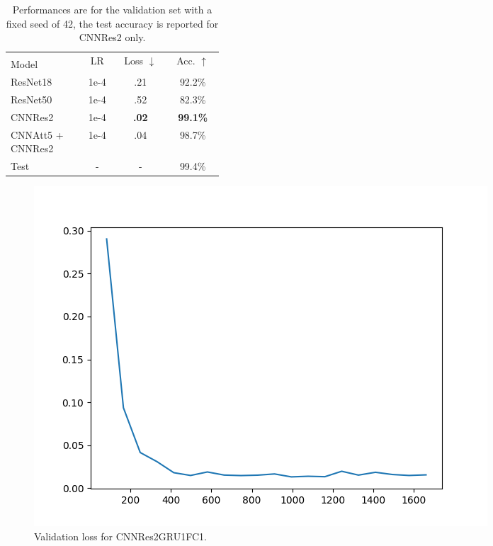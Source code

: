 \documentclass{article}
\begin{document}
\begin{table}[h!]
    \caption{Performances are for the validation set with a fixed seed of 42, the test accuracy is reported for CNNRes2 only.}
    \label{tab:joint-results}
    \begin{center}
        \begin{small}
            \begin{tabular}{p{0.35\linewidth} | ccc}
                \toprule
                & \multirow{2}{0.13\linewidth}{LR} 
                & \multirow{2}{0.13\linewidth}{Loss $\downarrow$} 
                & \multirow{2}{0.13\linewidth}{Acc. $\uparrow$} \\
                Model \\
                \midrule
                ResNet18 & 1e-4 & .21 & 92.2\% \\
                ResNet50 & 1e-4 & .52 & 82.3\% \\
                CNNRes2 & 1e-4 & \textbf{.02} & \textbf{99.1\%} \\
                CNNAtt5 + CNNRes2 & 1e-4 & .04 & 98.7\% \\
                \midrule
                \midrule
                Test & - & - & 99.4\% \\
                \bottomrule
            \end{tabular}
        \end{small}
    \end{center}
    \vspace{-0.5cm}
\end{table}

\begin{figure}
    \centering
    \includegraphics[scale=.5]{images/val_loss.png}
    \caption{Validation loss for CNNRes2GRU1FC1.}
    \label{fig:val-loss}
\end{figure}
\end{document}
